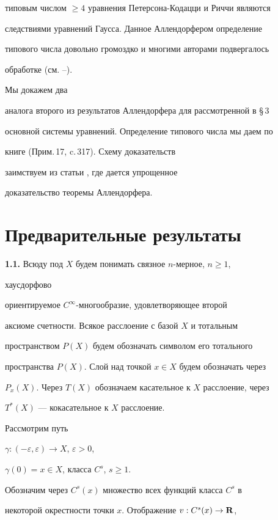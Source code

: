 типовым числом $\ge4$ уравнения Петерсона-Кодацци и Риччи являются


следствиями уравнений Гаусса. Данное Аллендорфером определение


типового числа довольно громоздко и многими авторами подвергалось


обработке (см. \cite{Yan}--\cite{Kob}).


Мы докажем два


аналога второго из результатов Аллендорфера для рассмотренной в \S\,3


основной системы уравнений. Определение типового числа мы даем по


книге \cite{Kob} (Прим.\,17, c.\,317). Схему доказательств


заимствуем из статьи \cite{Chern}, где дается упрощенное


доказательство теоремы Аллендорфера.





\section{Предварительные результаты}





{\bf 1.1.} Всюду под $X$ будем понимать связное $n$-мерное, $n\ge 1$,


хаусдорфово


ориентируемое $C^{\infty}$-многообразие, удовлетворяющее второй


аксиоме счетности. Всякое расслоение с базой $X$ и тотальным


пространством $P(X)$ будем обозначать символом его тотального


пространства $P(X)$. Слой над точкой $x\in X$ будем обозначать через


$P_x(X)$. Через $T(X)$ обозначаем касательное к $X$ расслоение, через


$T^*(X)$ --- кокасательное к $X$ расслоение.


Рассмотрим путь


$\gamma:(-\varepsilon,\varepsilon)\to X$, $\varepsilon>0$,


$\gamma(0)=x\in X$, класса $C^s$, $s\ge 1$.


Обозначим через $C^s(x)$ множество всех функций класса $C^s$ в


некоторой окрестности точки $x$. Отображение $v:C^s(x)\to{\bold R}$,


